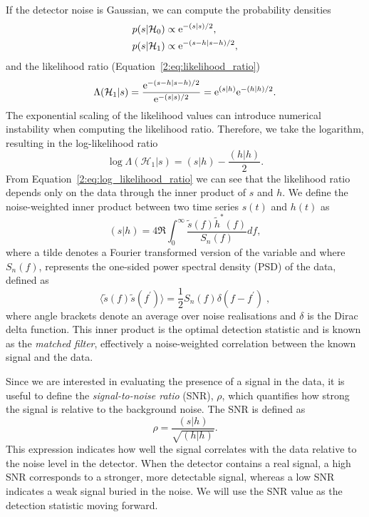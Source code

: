 If the detector noise is Gaussian, we can compute the probability densities
%
\begin{align}
    p(s|\mathcal{H}_{0}) &\propto {\rm e}^{-(s|s)/2}, \\ 
    p(s|\mathcal{H}_{1}) &\propto {\rm e}^{-(s-h|s-h)/2},
\end{align}
%
and the likelihood ratio (Equation~\ref{2:eq:likelihood_ratio})
%
\begin{equation}
    \Lambda(\mathcal{H}_{1}|s) = \frac{{\rm e}^{-(s-h|s-h)/2}}{{\rm e}^{-(s|s)/2}} = {\rm e}^{(s|h)}{\rm e}^{-(h|h)/2}.
\end{equation}
%
The exponential scaling of the likelihood values can introduce numerical instability when computing the likelihood ratio. Therefore, we take the logarithm, resulting in the log-likelihood ratio
%
\begin{equation}
    \log \Lambda(\mathcal{H}_{1}|s) = (s|h) - \frac{(h|h)}{2}.
    \label{2:eq:log_likelihood_ratio}
\end{equation}
%
From Equation~\ref{2:eq:log_likelihood_ratio} we can see that the likelihood ratio depends only on the data through the inner product of $s$ and $h$. We define the noise-weighted inner product between two time series $s(t)$ and $h(t)$ as
%
\begin{equation}
  (s | h) = 4 \Re \int^{\infty}_{0} \frac{\tilde{s}(f) \tilde{h}^*(f)}{S_n(f)} df,
  \label{2:eqn:inner_product}
\end{equation}
%
where a tilde denotes a Fourier transformed version of the variable and where $S_n(f)$, represents the one-sided power spectral density (PSD) of the data, defined as
%
\begin{equation}
  \langle \tilde{s}(f) \tilde{s}(f^\prime) \rangle = \frac{1}{2} S_n(f) \delta(f - f^\prime) \;,
  \label{2:eqn:psd}
\end{equation}
%
where angle brackets denote an average over noise realisations and $\delta$ is the Dirac delta function. This inner product is the optimal detection statistic and is known as the \textit{matched filter}, effectively a noise-weighted correlation between the known signal and the data.

Since we are interested in evaluating the presence of a signal in the data, it is useful to define the \textit{signal-to-noise ratio} (SNR), \( \rho \), which quantifies how strong the signal is relative to the background noise. The SNR is defined as~\cite{FINDCHIRP:2012}
%
\begin{equation}
    \rho = \frac{(s|h)}{\sqrt{(h|h)}}.
    \label{2:eq:snr}
\end{equation}
%
This expression indicates how well the signal correlates with the data relative to the noise level in the detector. When the detector contains a real signal, a high SNR corresponds to a stronger, more detectable signal, whereas a low SNR indicates a weak signal buried in the noise. We will use the SNR value as the detection statistic moving forward.

